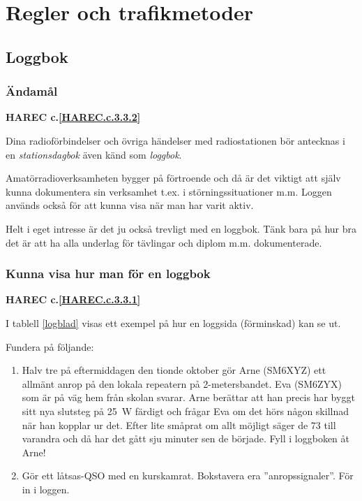 \chapter{Regler och trafikmetoder}

\section{Loggbok}

\subsection{Ändamål}
\textbf{HAREC
  c.\ref{HAREC.c.3.3.2}\label{myHAREC.c.3.3.2}
}

Dina radioförbindelser och övriga händelser med radiostationen bör
antecknas i en \emph{stationsdagbok} även känd som \emph{loggbok}.

Amatörradioverksamheten bygger på förtroende och då är det viktigt att
själv kunna dokumentera sin verksamhet t.ex. i störningssituationer m.m.
Loggen används också för att kunna visa när man har varit aktiv.

Helt i eget intresse är det ju också trevligt med en loggbok.
Tänk bara på hur bra det är att ha alla underlag för tävlingar och diplom
m.m. dokumenterade.

\subsection{Kunna visa hur man för en loggbok}
\textbf{HAREC
  c.\ref{HAREC.c.3.3.1}\label{myHAREC.c.3.3.1}
}

I tablell \ref{logblad} visas ett exempel på hur en loggsida (förminskad)
kan se ut.

Fundera på följande:
\begin{enumerate}
\item Halv tre på eftermiddagen den tionde oktober gör Arne (SM6XYZ)
  ett allmänt anrop på den lokala repeatern på 2-metersbandet.
  Eva (SM6ZYX) som är på väg hem från skolan svarar.
  Arne berättar att han precis har byggt sitt nya slutsteg på 25~W
  färdigt och frågar Eva om det hörs någon skillnad när han kopplar ur det.
  Efter lite småprat om allt möjligt säger de 73 till varandra och då har det
  gått sju minuter sen de började.
  Fyll i loggboken åt Arne!
\item Gör ett låtsas-QSO med en kurskamrat.
  Bokstavera era ''anropssignaler''.
  För in i loggen.
\end{enumerate}

